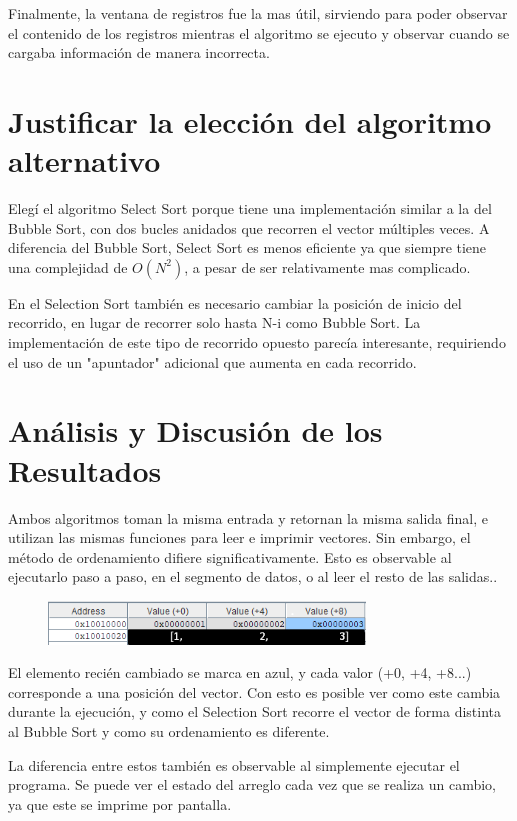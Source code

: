 \documentclass[titlepage]{article}
\begin{document}
Finalmente, la ventana de registros fue la mas útil, sirviendo para poder observar el contenido de los registros mientras el algoritmo se ejecuto y observar cuando se cargaba información de manera incorrecta.

\section*{Justificar la elección del algoritmo alternativo}

Elegí el algoritmo Select Sort porque tiene una implementación similar a la del Bubble Sort, con dos bucles anidados que recorren el vector múltiples veces. A diferencia del Bubble Sort, Select Sort es menos eficiente ya que siempre tiene una complejidad de $O(N^2)$, a pesar de ser relativamente mas complicado.

En el Selection Sort también es necesario cambiar la posición de inicio del recorrido, en lugar de recorrer solo hasta N-i como Bubble Sort. La implementación de este tipo de recorrido opuesto parecía interesante, requiriendo el uso de un "apuntador" adicional que aumenta en cada recorrido.

\section{Análisis y Discusión de los Resultados}

Ambos algoritmos toman la misma entrada y retornan la misma salida final, e utilizan las mismas funciones para leer e imprimir vectores. Sin embargo, el método de ordenamiento difiere significativamente. Esto es observable al ejecutarlo paso a paso, en el segmento de datos, o al leer el resto de las salidas..

\begin{figure}[h]
    \centering
    \includegraphics[width=0.75\textwidth]{images/step5.png} %
    \label{fig:step1}
\end{figure}

El elemento recién cambiado se marca en azul, y cada valor (+0, +4, +8...) corresponde a una posición del vector. Con esto es posible ver como este cambia durante la ejecución, y como el Selection Sort recorre el vector de forma distinta al Bubble Sort y como su ordenamiento es diferente.

La diferencia entre estos también es observable al simplemente ejecutar el programa. Se puede ver el estado del arreglo cada vez que se realiza un cambio, ya que este se imprime por pantalla.
\end{document}
